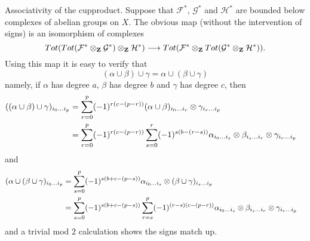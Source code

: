 \medskip\noindent
Associativity of the cupproduct. Suppose that ${\mathcal F}^*$,
${\mathcal G}^*$ and ${\mathcal H}^*$ are bounded below
complexes of abelian groups on $X$. The obvious map
(without the intervention of signs) is an isomorphism
of complexes
$$
Tot(Tot({\mathcal F}^*\otimes_{\bf Z} {\mathcal G}^*)\otimes_{\bf Z}
{\mathcal H}^*)
\longrightarrow
Tot({\mathcal F}^*\otimes_{\bf Z} Tot({\mathcal G}^*\otimes_{\bf Z}
{\mathcal H}^*)).
$$
Using this map it is easy to verify that
$$
(\alpha \cup \beta) \cup \gamma = \alpha \cup ( \beta \cup \gamma)
$$
namely, if $\alpha$ has degree $a$, $\beta$ has degree $b$ and
$\gamma$ has degree $c$, then
\begin{align*}
((\alpha \cup \beta) \cup \gamma)_{i_0\ldots i_p}
& =
\sum_{r=0}^p
(-1)^{r(c-(p-r))}
(\alpha\cup\beta)_{i_0\ldots i_r} \otimes \gamma_{i_r\ldots i_p}
\cr
& =
\sum_{r=0}^p
(-1)^{r(c-(p-r))}
\sum_{s=0}^r
(-1)^{s(b-(r-s))}
\alpha_{i_0\ldots i_s} \otimes \beta_{i_s\ldots i_r} \otimes
\gamma_{i_r\ldots i_p}
\end{align*}
and
\begin{align*}
(\alpha \cup (\beta \cup \gamma)_{i_0\ldots i_p}
& =
\sum_{s=0}^p
(-1)^{s(b+c-(p-s))}
\alpha_{i_0\ldots i_s} \otimes (\beta \cup \gamma)_{i_s\ldots i_p}
\cr
& =
\sum_{s=0}^p
(-1)^{s(b+c-(p-s))}
\sum_{r=s}^p
(-1)^{(r-s)(c-(p-r))}
\alpha_{i_0\ldots i_s} \otimes \beta_{i_s\ldots i_r} \otimes
\gamma_{i_r\ldots i_p}
\end{align*}
and a trivial mod $2$ calculation shows the signs match up.

